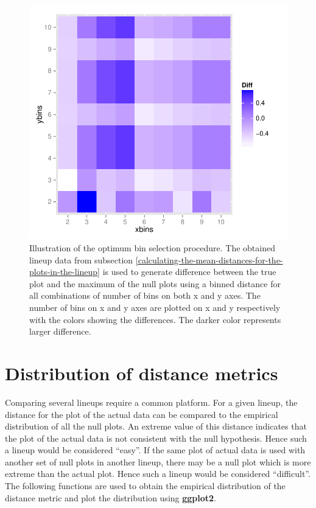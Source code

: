 \documentclass[article]{jss}
\begin{document}
\begin{figure}[hbtp]
\begin{center}
\includegraphics[scale=0.7]{nullabor-opt-bin.pdf}
\caption{Illustration of the optimum bin selection procedure. The obtained lineup data from subsection \ref{calculating-the-mean-distances-for-the-plots-in-the-lineup} is used to generate difference between the true plot and the maximum of the null plots using a binned distance for all combinations of number of bins on both x and y axes. The number of bins on x and y axes are plotted on x and y respectively with the colors showing the differences. The darker color represents larger difference. }
\label{opt-bin}
\end{center}
\end{figure}

\section{Distribution of distance metrics}\label{distr}

Comparing several lineups require a common platform. For a given lineup, the distance for the plot of the actual data can be compared to the empirical distribution of all the null plots. An extreme value of this distance indicates that the plot of the actual data is not consistent with the null hypothesis. Hence such a lineup would be considered ``easy''. If the same plot of actual data is used with another set of null plots in another lineup, there may be a null plot which is more extreme than the actual plot. Hence such a lineup would be considered ``difficult''. The following functions are used to obtain the empirical distribution of the distance metric and plot the distribution using \textbf{ggplot2}. 
\end{document}
